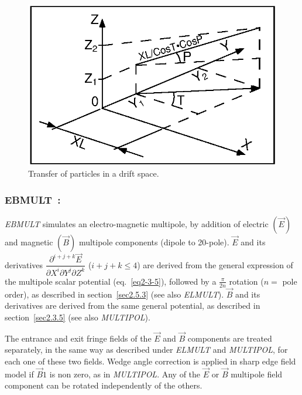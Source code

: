 \begin{figure}[H]
\centerline{\includegraphics[width=15cm]{Fig23.ps}}
\caption{\label{fig23}Transfer of particles in a drift space.}
\end{figure}
\vfill

\newpage
\subsubsection*{EBMULT~: \EBMULTTitl}\label{EBMULT} 
\medskip

\noindent\textsl{EBMULT} simulates an electro-magnetic multipole, by addition of
electric $ (\vec  E) $ and magnetic $ (\vec  B) $ multipole components (dipole to 20-pole). 
$\vec  E $ and its derivatives 
$ \dfrac{\partial^{ i+j+k} \vec  E }{ \partial X^i\partial Y^j\partial Z^k} $ 
($i+j+k \le 4$) are derived 
from the general expression of the multipole scalar potential (eq.~\ref{eq2-3-5}), followed by a 
$ \frac{\pi }{2n} $ rotation  ($n= $ pole order), 
as described in section~\ref{sec2.5.3} (see also \textsl{ELMULT}). $ \vec  B $ and its
derivatives are derived from the same general potential, as described in section~\ref{sec2.3.5} 
(see also \textsl{MULTIPOL}). 

\noindent The entrance and exit fringe fields of the $ \vec  E $ and $ \vec  B$ components are treated 
separately, in the same way as described under \textsl{ELMULT} 
 and \textsl{MULTIPOL},
for each one of these two fields. Wedge angle correction is applied in sharp edge field model if $ \vec  B1$ is non zero, as in \textsl{MULTIPOL}. Any of the $ \vec  E $ or $ \vec  B $ multipole field
component can be rotated independently of the others. 

